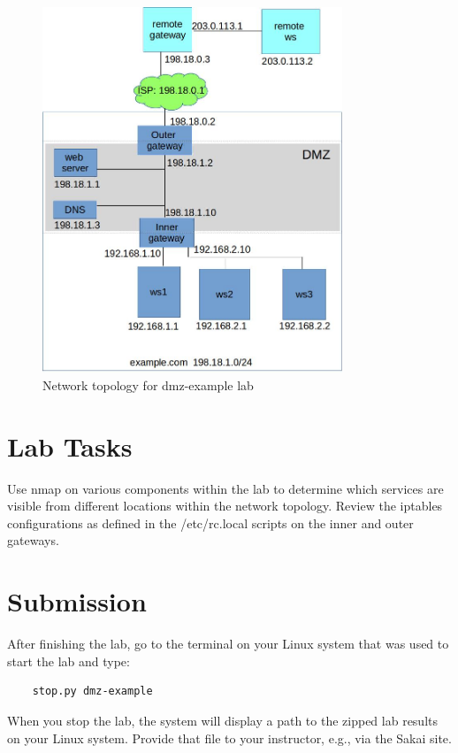 \begin{figure}[htb]
\begin{center}
\includegraphics [width=0.8\textwidth,natwidth=621,natheight=403]{dmz-example.jpg}
\end{center}
\caption{Network topology for dmz-example lab}
\label{fig:topology}
\end{figure}

\section{Lab Tasks}
Use nmap on various components within the lab to determine which services are visible from
different locations within the network topology.  Review the iptables configurations as
defined in the /etc/rc.local scripts on the inner and outer gateways.

\section{Submission}
After finishing the lab, go to the terminal on your Linux system that was used to start the lab and type:
\begin{verbatim}
    stop.py dmz-example
\end{verbatim}
When you stop the lab, the system will display a path to the zipped lab results on your Linux system.  Provide that file to 
your instructor, e.g., via the Sakai site.


